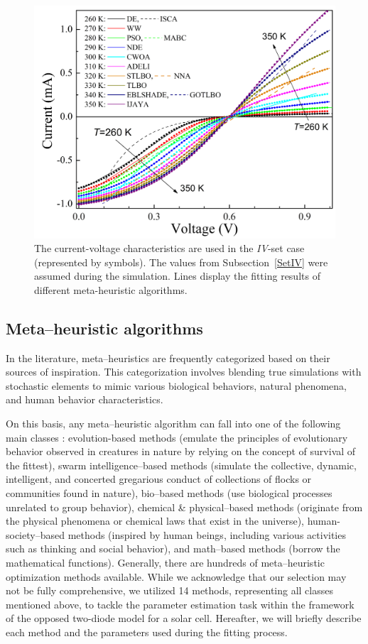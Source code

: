 \documentclass[a4paper,fleqn]{cas-sc}
\begin{document}
\begin{figure}[]
	\centering
		\includegraphics[width=0.5\columnwidth]{Fig3}
	  \caption{
        The current-voltage characteristics are used in the \emph{IV}-set case (represented by symbols).
        The values from Subsection~\ref{SetIV} were assumed during the simulation.
        Lines display the fitting results of different meta-heuristic algorithms.
}\label{figSetIV}
\end{figure}


\subsection{Meta--heuristic algorithms}\label{MHA}
In the literature, meta--heuristics are frequently categorized based on their sources of inspiration.
This categorization involves blending true simulations with stochastic elements
to mimic various biological behaviors, natural phenomena, and human behavior characteristics.

On this basis, any meta--heuristic algorithm can fall into one of the following main classes \cite{WhiteShark,Gannet,Dandelion}:
evolution-based methods (emulate the principles of evolutionary behavior observed in creatures in nature by relying on the concept of survival of the fittest),
swarm intelligence--based methods (simulate the collective, dynamic, intelligent, and concerted gregarious conduct of collections of flocks or communities found in nature),
bio--based methods (use biological processes unrelated to group behavior),
chemical \& physical--based methods (originate from the physical phenomena or chemical laws that exist in the universe),
human-society--based methods (inspired by human beings, including various activities such as thinking and social behavior),
and math--based methods (borrow the mathematical functions).
Generally, there are hundreds of meta--heuristic optimization methods available.
While we acknowledge that our selection may not be fully comprehensive,
we utilized 14 methods, representing all classes mentioned above,
to tackle the parameter estimation task within the framework of the opposed two-diode model for a solar cell.
Hereafter, we will briefly describe each method and the parameters used during the fitting process.
\end{document}
